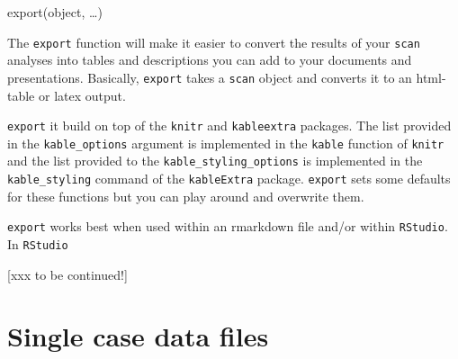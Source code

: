 \documentclass[
  letterpaper,
  DIV=11,
  numbers=noendperiod]{scrreprt}
\begin{document}
\begin{tcolorbox}[enhanced jigsaw, toprule=.15mm, colframe=quarto-callout-tip-color-frame, left=2mm, colback=white, breakable, bottomrule=.15mm, arc=.35mm, rightrule=.15mm, leftrule=.75mm, opacityback=0]
\begin{minipage}[t]{5.5mm}
\textcolor{quarto-callout-tip-color}{\faLightbulb}
\end{minipage}%
\begin{minipage}[t]{\textwidth - 5.5mm}
export(object, \ldots)\end{minipage}%
\end{tcolorbox}

The \texttt{export} function will make it easier to convert the results
of your \texttt{scan} analyses into tables and descriptions you can add
to your documents and presentations. Basically, \texttt{export} takes a
\texttt{scan} object and converts it to an html-table or latex output.

\begin{tcolorbox}[enhanced jigsaw, opacitybacktitle=0.6, breakable, bottomrule=.15mm, coltitle=black, colbacktitle=quarto-callout-note-color!10!white, colframe=quarto-callout-note-color-frame, left=2mm, colback=white, titlerule=0mm, leftrule=.75mm, opacityback=0, toptitle=1mm, title=\textcolor{quarto-callout-note-color}{\faInfo}\hspace{0.5em}{Note}, arc=.35mm, rightrule=.15mm, toprule=.15mm, bottomtitle=1mm]
\texttt{export} it build on top of the \texttt{knitr} and
\texttt{kableextra} packages. The list provided in the
\texttt{kable\_options} argument is implemented in the \texttt{kable}
function of \texttt{knitr} and the list provided to the
\texttt{kable\_styling\_options} is implemented in the
\texttt{kable\_styling} command of the \texttt{kableExtra} package.
\texttt{export} sets some defaults for these functions but you can play
around and overwrite them.
\end{tcolorbox}

\texttt{export} works best when used within an rmarkdown file and/or
within \texttt{RStudio}.\\
In \texttt{RStudio}

{[}xxx to be continued!{]}

\hypertarget{single-case-data-files}{%
\section{Single case data files}\label{single-case-data-files}}
\end{document}
